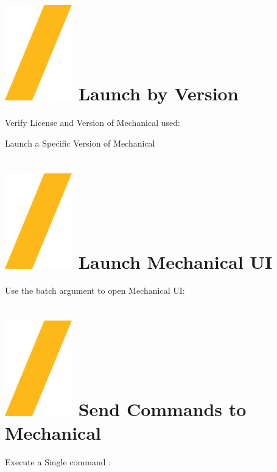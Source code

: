 \documentclass[9pt,landscape]{article}
\begin{document}
\begin{multicols}{3}
\section{\includegraphics[height=\fontcharht\font`\S]{slash.png} Launch by Version}

Verify License and Version of Mechanical used:


Launch a Specific Version of Mechanical





\section{\includegraphics[height=\fontcharht\font`\S]{slash.png} Launch  Mechanical UI}

Use the batch argument to open Mechanical UI:

\section{\includegraphics[height=\fontcharht\font`\S]{slash.png} Send Commands to Mechanical}
Execute a Single command :


\end{multicols}
\end{document}
